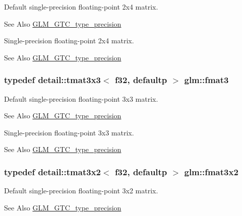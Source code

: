 Default single-\/precision floating-\/point 2x4 matrix. \begin{DoxySeeAlso}{See Also}
\hyperlink{group__gtc__type__precision}{G\-L\-M\-\_\-\-G\-T\-C\-\_\-type\-\_\-precision}
\end{DoxySeeAlso}
Single-\/precision floating-\/point 2x4 matrix. \begin{DoxySeeAlso}{See Also}
\hyperlink{group__gtc__type__precision}{G\-L\-M\-\_\-\-G\-T\-C\-\_\-type\-\_\-precision} 
\end{DoxySeeAlso}
\hypertarget{group__gtc__type__precision_gaa7b09502b183884aca53338c35b09509}{
\subsubsection[{fmat3}]{\setlength{\rightskip}{0pt plus 5cm}typedef detail\-::tmat3x3$<$ f32, defaultp $>$ {\bf glm\-::fmat3}}}\label{group__gtc__type__precision_gaa7b09502b183884aca53338c35b09509}
Default single-\/precision floating-\/point 3x3 matrix. \begin{DoxySeeAlso}{See Also}
\hyperlink{group__gtc__type__precision}{G\-L\-M\-\_\-\-G\-T\-C\-\_\-type\-\_\-precision}
\end{DoxySeeAlso}
Single-\/precision floating-\/point 3x3 matrix. \begin{DoxySeeAlso}{See Also}
\hyperlink{group__gtc__type__precision}{G\-L\-M\-\_\-\-G\-T\-C\-\_\-type\-\_\-precision} 
\end{DoxySeeAlso}
\hypertarget{group__gtc__type__precision_ga723b6e3dd4ff1c0d76d3c9f72ea0d9a7}{
\subsubsection[{fmat3x2}]{\setlength{\rightskip}{0pt plus 5cm}typedef detail\-::tmat3x2$<$ f32, defaultp $>$ {\bf glm\-::fmat3x2}}}\label{group__gtc__type__precision_ga723b6e3dd4ff1c0d76d3c9f72ea0d9a7}
Default single-\/precision floating-\/point 3x2 matrix. \begin{DoxySeeAlso}{See Also}
\hyperlink{group__gtc__type__precision}{G\-L\-M\-\_\-\-G\-T\-C\-\_\-type\-\_\-precision}
\end{DoxySeeAlso}
